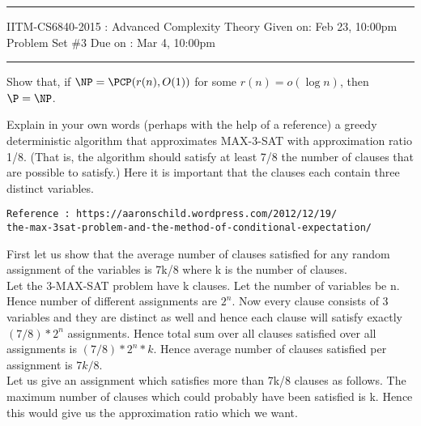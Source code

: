 \documentclass[12pt]{exam}
\begin{document}
\hrule
\vspace{3mm}
\noindent
{\sf IITM-CS6840-2015 : Advanced Complexity Theory  \hfill Given on: Feb 23, 10:00pm}
\vspace{3mm} \\
\noindent
{\sf Problem Set \#3 \hfill Due on : Mar 4, 10:00pm}
\vspace{3mm}
\hrule

\begin{questions}

\question[10]
Show that, if $\NP = \PCP(r(n), O(1))$ for some $r(n) = o(\log n)$, then $\P = \NP$.

\question[10] Explain in your own words (perhaps with the help of a reference) a greedy deterministic algorithm that approximates MAX-3-SAT with approximation ratio 1/8. (That is, the algorithm should satisfy at least 7/8 the number of clauses that are possible to satisfy.) Here it is important that the clauses each contain three distinct variables.
\begin{solution}
\begin{verbatim}
Reference : https://aaronschild.wordpress.com/2012/12/19/
the-max-3sat-problem-and-the-method-of-conditional-expectation/
\end{verbatim}
First let us show that the average number of clauses satisfied for
any random assignment of the variables is 7k/8 where k is the number of
clauses.\\
Let the 3-MAX-SAT problem have k clauses. Let the number of variables
be n. Hence number of different assignments are $2^n$.
Now every clause consists of 3 variables and they
are distinct as well and hence each clause will satisfy exactly
$(7/8)*2^n$ assignments. Hence total sum over all clauses satisfied over all
assignments is $(7/8)*2^n*k$. Hence average number of clauses
satisfied per assignment is $7k/8$.\\
Let us give an assignment which satisfies more than 7k/8 clauses as follows.
The maximum number of clauses which could probably have been satisfied is k.
Hence this would give us the approximation ratio which we want.\\


\end{solution}
\end{questions}
\end{document}

